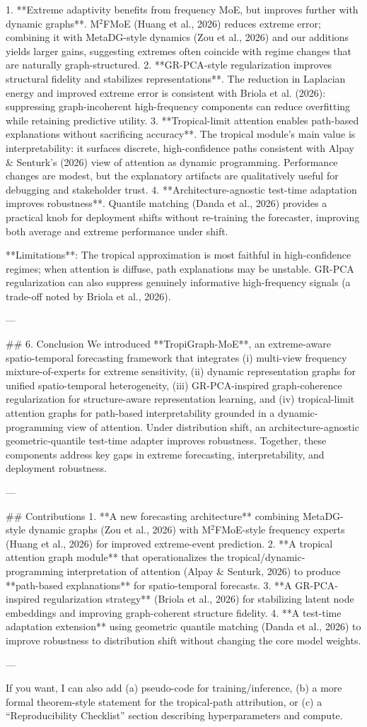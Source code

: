 1. **Extreme adaptivity benefits from frequency MoE, but improves further with dynamic graphs**. M\(^2\)FMoE (Huang et al., 2026) reduces extreme error; combining it with MetaDG-style dynamics (Zou et al., 2026) and our additions yields larger gains, suggesting extremes often coincide with regime changes that are naturally graph-structured.  
2. **GR-PCA-style regularization improves structural fidelity and stabilizes representations**. The reduction in Laplacian energy and improved extreme error is consistent with Briola et al. (2026): suppressing graph-incoherent high-frequency components can reduce overfitting while retaining predictive utility.  
3. **Tropical-limit attention enables path-based explanations without sacrificing accuracy**. The tropical module’s main value is interpretability: it surfaces discrete, high-confidence paths consistent with Alpay & Senturk’s (2026) view of attention as dynamic programming. Performance changes are modest, but the explanatory artifacts are qualitatively useful for debugging and stakeholder trust.  
4. **Architecture-agnostic test-time adaptation improves robustness**. Quantile matching (Danda et al., 2026) provides a practical knob for deployment shifts without re-training the forecaster, improving both average and extreme performance under shift.

**Limitations**: The tropical approximation is most faithful in high-confidence regimes; when attention is diffuse, path explanations may be unstable. GR-PCA regularization can also suppress genuinely informative high-frequency signals (a trade-off noted by Briola et al., 2026).  

---

## 6. Conclusion  
We introduced **TropiGraph-MoE**, an extreme-aware spatio-temporal forecasting framework that integrates (i) multi-view frequency mixture-of-experts for extreme sensitivity, (ii) dynamic representation graphs for unified spatio-temporal heterogeneity, (iii) GR-PCA-inspired graph-coherence regularization for structure-aware representation learning, and (iv) tropical-limit attention graphs for path-based interpretability grounded in a dynamic-programming view of attention. Under distribution shift, an architecture-agnostic geometric-quantile test-time adapter improves robustness. Together, these components address key gaps in extreme forecasting, interpretability, and deployment robustness.

---

## Contributions  
1. **A new forecasting architecture** combining MetaDG-style dynamic graphs (Zou et al., 2026) with M\(^2\)FMoE-style frequency experts (Huang et al., 2026) for improved extreme-event prediction.  
2. **A tropical attention graph module** that operationalizes the tropical/dynamic-programming interpretation of attention (Alpay & Senturk, 2026) to produce **path-based explanations** for spatio-temporal forecasts.  
3. **A GR-PCA-inspired regularization strategy** (Briola et al., 2026) for stabilizing latent node embeddings and improving graph-coherent structure fidelity.  
4. **A test-time adaptation extension** using geometric quantile matching (Danda et al., 2026) to improve robustness to distribution shift without changing the core model weights.  

--- 

If you want, I can also add (a) pseudo-code for training/inference, (b) a more formal theorem-style statement for the tropical-path attribution, or (c) a “Reproducibility Checklist” section describing hyperparameters and compute.